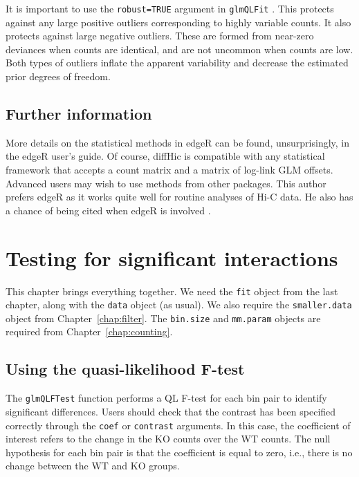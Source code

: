 \documentclass[12pt]{report}
\newcommand{\edgeR}{edgeR}
\newcommand{\pkgname}{diffHic}
\newcommand{\code}[1]{{\small\texttt{#1}}}
\newenvironment{combox}
{ \begin{shaded}\begin{center}\begin{minipage}[t]{0.95\textwidth} }
{ \end{minipage}\end{center}\end{shaded} }
\begin{document}
It is important to use the \code{robust=TRUE} argument in \code{glmQLFit} \citep{phipson2016robust}.
This protects against any large positive outliers corresponding to highly variable counts.
It also protects against large negative outliers.
These are formed from near-zero deviances when counts are identical, and are not uncommon when counts are low.
Both types of outliers inflate the apparent variability and decrease the estimated prior degrees of freedom.

\section{Further information}
More details on the statistical methods in \edgeR{} can be found, unsurprisingly, in the \edgeR{} user's guide.
Of course, \pkgname{} is compatible with any statistical framework that accepts a count matrix and a matrix of log-link GLM offsets.
Advanced users may wish to use methods from other packages.
This author prefers \edgeR{} as it works quite well for routine analyses of Hi-C data.
He also has a chance of being cited when \edgeR{} is involved \citep{chen2014differential}.

\chapter{Testing for significant interactions}

\begin{combox}
This chapter brings everything together.
We need the \code{fit} object from the last chapter, along with the \code{data} object (as usual).
We also require the \code{smaller.data} object from Chapter~\ref{chap:filter}.
The \code{bin.size} and \code{mm.param} objects are required from Chapter~\ref{chap:counting}.
\end{combox}

\section{Using the quasi-likelihood F-test}
The \code{glmQLFTest} function performs a QL F-test for each bin pair to identify significant differences.
Users should check that the contrast has been specified correctly through the \code{coef} or \code{contrast} arguments.
In this case, the coefficient of interest refers to the change in the KO counts over the WT counts.
The null hypothesis for each bin pair is that the coefficient is equal to zero, i.e., there is no change between the WT and KO groups.
\end{document}
